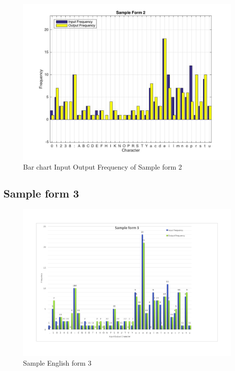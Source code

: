 \begin{figure}[H]
\centering
\includegraphics[width=1\textwidth]{Form2}
\caption {Bar chart Input Output Frequency of Sample form 2}
\label {fig:bar2}
\end{figure}

\subsection{Sample form 3}

\begin{figure}[H]
\centering
\includegraphics[width=1\textwidth]{form3}
\caption {Sample English form 3}
\label {fig:form3}
\end{figure}

